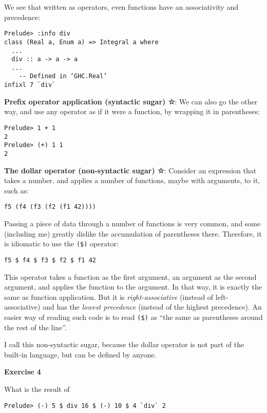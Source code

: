 \documentclass[11pt,
  american,
  DIV13]{article}
\begin{document}
We see that written as operators, even functions have an associativity
and precedence:

\begin{verbatim}
Prelude> :info div
class (Real a, Enum a) => Integral a where
  ...
  div :: a -> a -> a
  ...
    -- Defined in ‘GHC.Real’
infixl 7 `div`
\end{verbatim}

\textbf{Prefix operator application (syntactic sugar) ☆}: We can also go
the other way, and use any operator as if it were a function, by
wrapping it in parentheses:

\begin{verbatim}
Prelude> 1 + 1
2
Prelude> (+) 1 1
2
\end{verbatim}

\textbf{The dollar operator (non-syntactic sugar) ☆}: Consider an
expression that takes a number, and applies a number of functions, maybe
with arguments, to it, such as:

\begin{verbatim}
f5 (f4 (f3 (f2 (f1 42))))
\end{verbatim}

Passing a piece of data through a number of functions is very common,
and some (including me) greatly dislike the accumulation of parentheses
there. Therefore, it is idiomatic to use the \texttt{(\$)} operator:

\begin{verbatim}
f5 $ f4 $ f3 $ f2 $ f1 42
\end{verbatim}

This operator takes a function as the first argument, an argument as the
second argument, and applies the function to the argument. In that way,
it is exactly the same as function application. But it is
\emph{right-associative} (instead of left-associative) and has the
\emph{lowest precedence} (instead of the highest precedence). An easier
way of reading such code is to read \texttt{(\$)} as ``the same as
parentheses around the rest of the line''.

I call this non-syntactic sugar, because the dollar operator is not part
of the built-in language, but can be defined by anyone.

\textbf{Exercise 4}

What is the result of

\begin{verbatim}
Prelude> (-) 5 $ div 16 $ (-) 10 $ 4 `div` 2
\end{verbatim}
\end{document}
